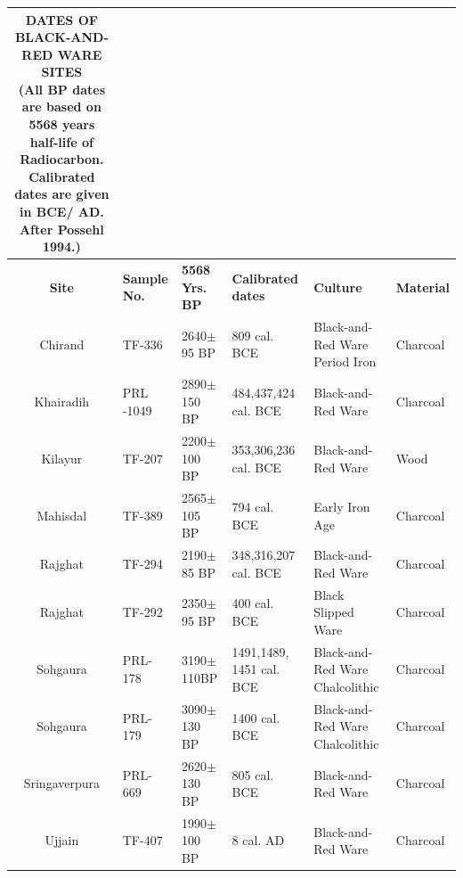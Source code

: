 {{\setlength\tabcolsep{2pt}
{\fontsize{7}{9}\selectfont
\begin{longtable}{|c|p{1cm}|p{1.5cm}|p{1.5cm}|p{1.5cm}|p{1.3cm}|}
\captionsetup{font=footnotesize}
\caption{DATES OF BLACK-AND-RED WARE SITES\\[10pt]
(All BP dates are based on 5568 years half-life of Radiocarbon. \\
Calibrated dates are given in BCE/ AD. After Possehl 1994.)}\label{table III.4}\\
\hline
\multicolumn{1}{|m{1cm}|}{\centering \textbf{Site}} &\multicolumn{1}{m{1cm}|}{\centering \textbf{Sample No.}}&\multicolumn{1}{m{1.5cm}|}{\centering \textbf{5568 Yrs. BP}} &\multicolumn{1}{m{1.5cm}|}{\centering \textbf{Calibrated dates}} & \multicolumn{1}{m{1.5cm}|}{\centering \textbf{Culture}} & \multicolumn{1}{m{1.4cm}|}{\centering \textbf{Material}}\\
\endfirsthead
\hline
\endhead
\hline
\endfoot
\hline
Chirand & TF-336 & 2640$\pm$95 BP & 809 cal. BCE & Black-and-Red Ware Period Iron & Charcoal\\
Khairadih & PRL -1049 & 2890$\pm$150 BP & 484,437,424 cal. BCE & Black-and-Red Ware & Charcoal\\
Kilayur & TF-207 & 2200$\pm$100 BP & 353,306,236 cal. BCE & Black-and-Red Ware & Wood\\
Mahisdal & TF-389 & 2565$\pm$105 BP & 794 cal. BCE & Early Iron Age & Charcoal\\
Rajghat & TF-294 & 2190$\pm$85 BP & 348,316,207 cal. BCE & Black-and-Red Ware & Charcoal\\
Rajghat & TF-292 & 2350$\pm$95 BP & 400 cal. BCE & Black Slipped Ware & Charcoal\\
Sohgaura & PRL-178 & 3190$\pm$110BP & 1491,1489, 1451 cal. BCE & Black-and-Red Ware Chalcolithic & Charcoal\\
Sohgaura & PRL-179 & 3090$\pm$130 BP & 1400 cal. BCE & Black-and-Red Ware Chalcolithic & Charcoal\\
Sringaverpura & PRL-669 & 2620$\pm$130 BP & 805 cal. BCE & Black-and-Red Ware & Charcoal\\
Ujjain  & TF-407 & 1990$\pm$100 BP & 8 cal. AD & Black-and-Red Ware & Charcoal
\end{longtable}
}}

}
